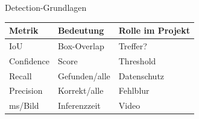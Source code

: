 \begin{frame}{Detection-Grundlagen}
\small
\begin{tabular}{l l l}
\toprule
Metrik & Bedeutung & Rolle im Projekt \\
\midrule
IoU & Box-Overlap & Treffer? \\
Confidence & Score & Threshold \\
Recall & Gefunden/alle & Datenschutz \\
Precision & Korrekt/alle & Fehlblur \\
ms/Bild & Inferenzzeit & Video \\
\bottomrule
\end{tabular}
\end{frame}
